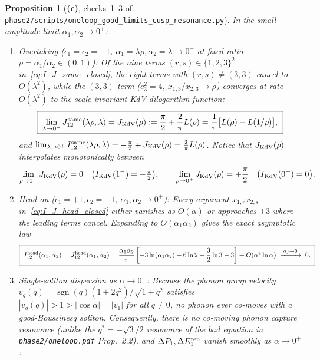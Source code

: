 \documentclass[11pt,a4paper]{article}
\newcommand{\Lc}{\textsf{\textbf{(c)}}}
\newcommand{\script}[1]{\texttt{phase2/\allowbreak scripts/\allowbreak #1}}
\newtheorem{proposition}{Proposition}[section]
\theoremstyle{remark}
\begin{document}
\begin{proposition}[\Lc, checks~1--3 of \script{oneloop\_good\_limits\_cusp\_resonance.py}]\label{prop:small_amp}
In the small-amplitude limit $\alpha_1,\alpha_2\to 0^+$:
\begin{enumerate}
\item \emph{Overtaking ($\epsilon_1=\epsilon_2=+1$, $\alpha_1=\lambda\rho,\alpha_2=\lambda\to 0^+$ at fixed ratio $\rho=\alpha_1/\alpha_2\in(0,1)$):}
Of the nine terms $(r,s)\in\{1,2,3\}^2$ in~\eqref{eq:I_J_same_closed}, the eight terms with $(r,s)\neq(3,3)$ cancel to $O(\lambda^2)$, while the $(3,3)$ term ($c_3^2=4$, $x_{1,3}/x_{2,3}\to\rho$) converges at rate $O(\lambda^2)$ to the scale-invariant KdV dilogarithm function:
\begin{equation}\label{eq:J_KdV}
\boxed{\ \lim_{\lambda\to 0^+}J_{12}^{\rm same}(\lambda\rho,\lambda)=J_{\rm KdV}(\rho):=\frac{\pi}{2}+\frac{2}{\pi}L(\rho)=\frac{1}{\pi}\big[L(\rho)-L(1/\rho)\big],\ }
\end{equation}
and $\lim_{\lambda\to 0^+}I_{12}^{\rm same}(\lambda\rho,\lambda)=-\frac{\pi}{2}+J_{\rm KdV}(\rho)=\frac{2}{\pi}L(\rho)$. Notice that $J_{\rm KdV}(\rho)$ interpolates monotonically between
\begin{equation}\label{eq:J_KdV_endpoints}
\lim_{\rho\to 1^-}J_{\rm KdV}(\rho)=0\quad\big(I_{\rm KdV}(1^-)=-\tfrac{\pi}{2}\big),\qquad
\lim_{\rho\to 0^+}J_{\rm KdV}(\rho)=+\frac{\pi}{2}\quad\big(I_{\rm KdV}(0^+)=0\big).
\end{equation}
\item \emph{Head-on ($\epsilon_1=+1,\epsilon_2=-1$, $\alpha_1,\alpha_2\to 0^+$):}
Every argument $x_{1,r}x_{2,s}$ in~\eqref{eq:I_J_head_closed} either vanishes as $O(\alpha)$ or approaches $\pm 3$ where the leading terms cancel. Expanding to $O(\alpha_1\alpha_2)$ gives the exact asymptotic law
\begin{equation}\label{eq:I_head_small}
\boxed{\ I_{12}^{\rm head}(\alpha_1,\alpha_2)=J_{12}^{\rm head}(\alpha_1,\alpha_2)
=\frac{\alpha_1\alpha_2}{\pi}\left[-3\ln(\alpha_1\alpha_2)+6\ln 2-\frac{3}{2}\ln 3-3\right]+O(\alpha^4\ln\alpha)\;\xrightarrow{\;\alpha_j\to 0\;}\;0.\ }
\end{equation}
\item \emph{Single-soliton dispersion as $\alpha\to 0^+$:}
Because the phonon group velocity $v_g(q)=\operatorname{sgn}(q)(1+2q^2)/\sqrt{1+q^2}$ satisfies $|v_g(q)|>1>|\cos\alpha|=|v_1|$ for all $q\neq 0$, \emph{no phonon ever co-moves with a good-Boussinesq soliton}. Consequently, there is no co-moving phonon capture resonance (unlike the $q^*=-\sqrt{3}/2$ resonance of the bad equation in \texttt{phase2/oneloop.pdf} Prop.~2.2), and $\Delta P_1,\Delta E_1^{\rm ren}$ vanish smoothly as $\alpha\to 0^+$:

\end{enumerate}
\end{proposition}
\end{document}
